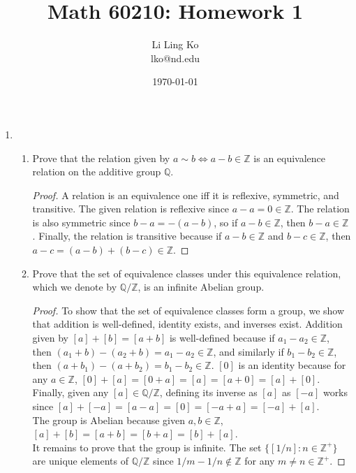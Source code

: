 \documentclass{article}
\begin{document}
\title{Math 60210: Homework 1}
\author{Li Ling Ko\\ lko@nd.edu}
\date{\today}
\maketitle

\begin{enumerate}
  \item
    \begin{enumerate}
      \item Prove that the relation given by $a \sim b \Longleftrightarrow
        a-b \in \mathbb{Z} $ is an equivalence relation on the additive group
        $\mathbb{Q}$.
        \begin{proof}
          A relation is an equivalence one iff it is reflexive, symmetric,
          and transitive. The given relation is reflexive since
          $a-a=0\in\mathbb{Z}$. The relation is also symmetric since
          $b-a=-(a-b)$, so if $a-b\in\mathbb{Z}$, then $b-a\in\mathbb{Z}$.
          Finally, the relation is transitive because if $a-b\in\mathbb{Z}$
          and $b-c\in\mathbb{Z}$, then $a-c=(a-b)+(b-c)\in\mathbb{Z}$.
        \end{proof}
      \item Prove that the set of equivalence classes under this equivalence
        relation, which we denote by $\mathbb{Q}/\mathbb{Z}$, is an infinite
        Abelian group.
        \begin{proof}
          To show that the set of equivalence classes form a group, we show
          that addition is well-defined, identity exists, and inverses exist.
          Addition given by $[a]+[b]=[a+b]$ is well-defined because if
          $a_1-a_2\in\mathbb{Z}$, then
          $(a_1+b)-(a_2+b)=a_1-a_2\in\mathbb{Z}$, and similarly if
          $b_1-b_2\in\mathbb{Z}$, then
          $(a+b_1)-(a+b_2)=b_1-b_2\in\mathbb{Z}$.
          $[0]$ is an identity because for any $a\in\mathbb{Z}$,
          $[0]+[a]=[0+a]=[a]=[a+0]=[a]+[0]$. Finally, given any
          $[a]\in\mathbb{Q}/\mathbb{Z}$, defining its inverse as $[a]$ as
          $[-a]$ works since $[a]+[-a]=[a-a]=[0]=[-a+a]=[-a]+[a]$. \\

          The group is Abelian because given $a,b\in\mathbb{Z}$,
          $[a]+[b]=[a+b]=[b+a]=[b]+[a]$. \\

          It remains to prove that the group is infinite. The set
          $\{[1/n]:n\in\mathbb{Z}^+\}$ are unique elements of
          $\mathbb{Q}/\mathbb{Z}$ since $1/m-1/n\notin\mathbb{Z}$ for any
          $m\neq n\in\mathbb{Z}^+$.
        \end{proof}
    \end{enumerate}


\end{enumerate}
\end{document}
